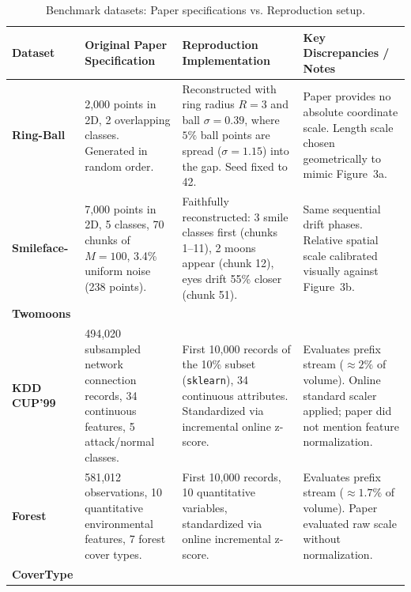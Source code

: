 \begin{table}[H]
\centering
\caption{Benchmark datasets: Paper specifications vs. Reproduction setup.}
\label{tab:dataset_specs}
\small
\begin{tabularx}{\textwidth}{@{}l L L L@{}}
\toprule
\textbf{Dataset} & \textbf{Original Paper Specification} & \textbf{Reproduction Implementation} & \textbf{Key Discrepancies / Notes} \\
\midrule
\textbf{Ring-Ball} & 2,000 points in 2D, 2 overlapping classes. Generated in random order. & Reconstructed with ring radius $R=3$ and ball $\sigma=0.39$, where $5\%$ ball points are spread ($\sigma=1.15$) into the gap. Seed fixed to 42. & Paper provides no absolute coordinate scale. Length scale chosen geometrically to mimic Figure~3a. \\
\addlinespace[2pt]
\textbf{Smileface-} & 7,000 points in 2D, 5 classes, 70 chunks of $M=100$, 3.4\% uniform noise (238 points). & Faithfully reconstructed: 3 smile classes first (chunks 1--11), 2 moons appear (chunk 12), eyes drift 55\% closer (chunk 51). & Same sequential drift phases. Relative spatial scale calibrated visually against Figure~3b. \\
\textbf{Twomoons} & \\
\addlinespace[2pt]
\textbf{KDD CUP'99} & 494,020 subsampled network connection records, 34 continuous features, 5 attack/normal classes. & First 10,000 records of the 10\% subset (\texttt{sklearn}), 34 continuous attributes. Standardized via incremental online z-score. & Evaluates prefix stream ($\approx 2\%$ of volume). Online standard scaler applied; paper did not mention feature normalization. \\
\addlinespace[2pt]
\textbf{Forest} & 581,012 observations, 10 quantitative environmental features, 7 forest cover types. & First 10,000 records, 10 quantitative variables, standardized via online incremental z-score. & Evaluates prefix stream ($\approx 1.7\%$ of volume). Paper evaluated raw scale without normalization. \\
\textbf{CoverType} & \\
\bottomrule
\end{tabularx}
\end{table}

